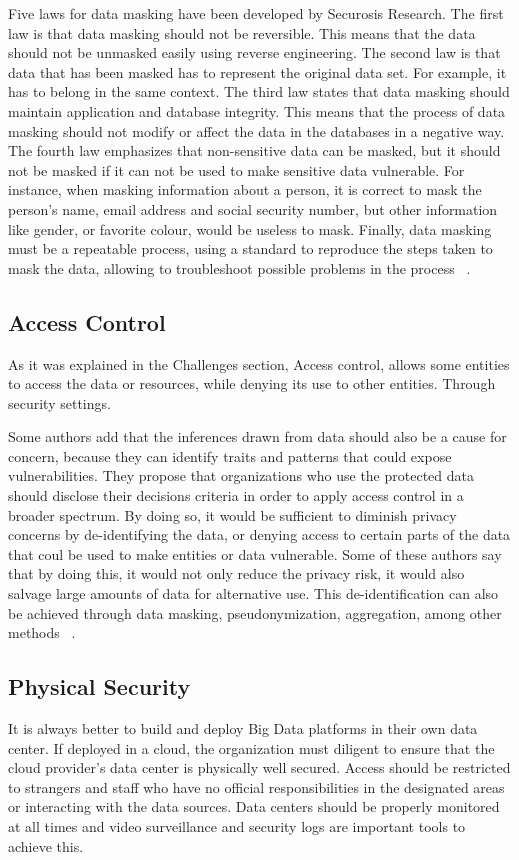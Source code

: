 \documentclass[sigconf]{acmart}
\begin{document}
Five laws for data masking have been developed by Securosis Research. 
The first law is that data masking should not be reversible. This means that the data should not be unmasked easily using reverse engineering. 
The second law is that data that has been masked has to represent the original data set. For example, it has to belong in the same context.
The third law states that data masking should maintain application and database integrity. This means that the process of data masking should not modify or affect the data in the databases in a negative way. 
The fourth law emphasizes that non-sensitive data can be masked, but it should not be masked if it can not be used to make sensitive data vulnerable. For instance, when masking information about a person, it is correct to mask the person’s name, email address and social security number, but other information like gender, or favorite colour, would be useless to mask.
Finally, data masking must be a repeatable process, using a standard to reproduce the steps taken to mask the data, allowing to troubleshoot possible problems in the process ~\cite{archana2017big}.


\subsection{Access Control}
As it was explained in the Challenges section, Access control, allows some entities to access the data or resources, while denying its use to other entities. Through security settings. 

Some authors add that the inferences drawn from data should also be a cause for concern, because they can identify traits and patterns that could  expose vulnerabilities. They propose that organizations who use the protected data should disclose their decisions criteria in order to apply access control in a broader spectrum. By doing so, it would be sufficient to diminish privacy concerns by de-identifying the data, or denying access to certain parts of the data that coul be used to make entities or data vulnerable. Some of these authors say that by doing this, it would not only reduce the privacy risk,  it would also salvage large amounts of data for alternative use. This de-identification can also be achieved through data masking, pseudonymization, aggregation, among other methods ~\cite{tene2012big}.

\subsection{Physical Security}
It is always better to build and deploy Big Data platforms in their own data center. If deployed in a cloud, the organization must diligent to ensure that the cloud provider's data center is physically well secured. Access should be restricted to strangers and staff who have no official responsibilities in the designated areas or interacting with the data sources. Data centers should be properly monitored at all times and video surveillance and security logs are important tools to achieve this.  
\end{document}

